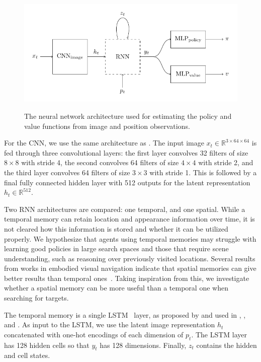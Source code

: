 \begin{figure}
    \centering
    \includegraphics{figures/architecture.pdf}
    \label{fig:architecture}
    \caption[Network architecture]{The neural network architecture used for estimating the policy and value functions from image and position observations.}
\end{figure}

For the CNN, we use the same architecture as \cite{mnih_human_2015}.
The input image \(x_t \in \mathbb{R}^{3 \times 64 \times 64}\) is fed through three convolutional layers: the first layer convolves 32 filters of size \(8 \times 8\) with stride 4, the second convolves 64 filters of size \(4 \times 4\) with stride 2, and the third layer convolves 64 filters of size \(3 \times 3\) with stride 1.
This is followed by a final fully connected hidden layer with 512 outputs for the latent representation \(h_t \in \mathbb{R}^{512}\).

Two RNN architectures are compared: one temporal, and one spatial.
While a temporal memory can retain location and appearance information over time, it is not cleared how this information is stored and whether it can be utilized properly.
We hypothesize that agents using temporal memories may struggle with learning good policies in large search spaces and those that require scene understanding, such as reasoning over previously visited locations.
Several results from works in embodied visual navigation indicate that spatial memories can give better results than temporal ones~\cite{parisotto_salakhutdinov_2017,henriques_vedaldi_2018,gupta_cognitive_2019,chaplot_semantic_2020}.
Taking inspiration from this, we investigate whether a spatial memory can be more useful than a temporal one when searching for targets.

The temporal memory is a single LSTM~\cite{hochreiter_schmidhuber_lstm_1997} layer, as proposed by \cite{hausknecht_stone_2017} and used in \cite{mnih_asynchronous_2016}, \cite{mirowski_navigate_2017}, and \cite{gupta_cognitive_2019}.
As input to the LSTM, we use the latent image representation \(h_t\) concatenated with one-hot encodings of each dimension of \(p_t\).
The LSTM layer has 128 hidden cells so that \(y_t\) has 128 dimensions.
Finally, \(z_t\) contains the hidden and cell states.

